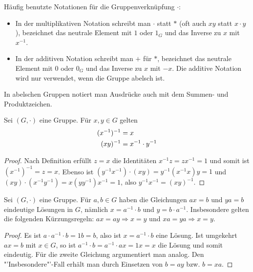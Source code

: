 \begin{remark}
	Häufig benutzte Notationen für die Gruppenverknüpfung $\cdot$:
	\begin{itemize}
		\item In der multiplikativen Notation schreibt man $\cdot$ statt $*$ (oft auch $xy$ statt 
		$x \cdot y$), bezeichnet das neutrale Element mit $1$ oder $1_G$ und das Inverse zu $x$ mit
		$x^{-1}$.
		\item In der additiven Notation schreibt man $+$ für $*$, bezeichnet das neutrale Element
		mit $0$ oder $0_G$ und das Inverse zu $x$ mit $-x$. Die additive Notation wird nur verwendet,
		wenn die Gruppe abelsch ist.
	\end{itemize}
\end{remark}

In abelschen Gruppen notiert man Ausdrücke auch mit dem Summen- und Produktzeichen. \\

\begin{proposition}
	Sei $(G,\cdot)$ eine Gruppe. Für $x,y \in G$ gelten
	\begin{align}
		(x^{-1})^{-1} &= x \notag \\
		(xy)^{-1} &= x^{-1} \cdot y^{-1} \notag
	\end{align}
\end{proposition}
\begin{proof}
	Nach Definition erfüllt $z=x$ die Identitäten $x^{-1}z=zx^{-1}=1$ und somit ist $(x^{-1})^{-1}=z=x$. Ebenso ist 
	$(y^{-1}x^{-1})\cdot (xy)=y^{-1}(x^{-1}x)y=1$ und $(xy)\cdot (x^{-1}y^{-1})=x(yy^{-1})x^{-1}=1$, also $y^{-1}
	x^{-1}=(xy)^{-1}$.
\end{proof}

\begin{proposition}
	Sei $(G,\cdot)$ eine Gruppe. Für $a,b \in G$ haben die Gleichungen $ax=b$ und
	$ya=b$ eindeutige Lösungen in $G$, nämlich $x=a^{-1} \cdot b$ und $y=b \cdot a^{-1}$. 
	Insbesondere gelten die folgenden Kürzungsregeln: $ax=ay \Rightarrow x=y$ und $xa=ya 
	\Rightarrow x=y$.
\end{proposition}
\begin{proof}
	Es ist $a \cdot a^{-1} \cdot b = 1b=b$, also ist $x=a^{-1} \cdot b$ eine Lösung. Ist umgekehrt
	$ax=b$ mit $x \in G$, so ist $a^{-1} \cdot b = a^{-1} \cdot ax = 1x = x$ die Lösung und somit
	eindeutig. Für die zweite Gleichung argumentiert man analog. Den "'Insbesondere"'-Fall erhält
	man durch Einsetzen von $b=ay$ bzw. $b=xa$.
\end{proof}

